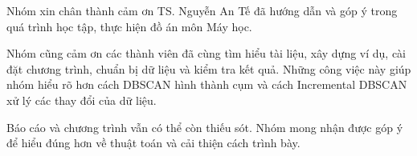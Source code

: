 Nhóm xin chân thành cảm ơn TS. Nguyễn An Tế đã hướng dẫn và góp ý trong quá trình học tập, thực hiện đồ án môn Máy học.

Nhóm cũng cảm ơn các thành viên đã cùng tìm hiểu tài liệu, xây dựng ví dụ, cài đặt chương trình, chuẩn bị dữ liệu và kiểm tra kết quả. Những công việc này giúp nhóm hiểu rõ hơn cách DBSCAN hình thành cụm và cách Incremental DBSCAN xử lý các thay đổi của dữ liệu.

Báo cáo và chương trình vẫn có thể còn thiếu sót. Nhóm mong nhận được góp ý để hiểu đúng hơn về thuật toán và cải thiện cách trình bày.
